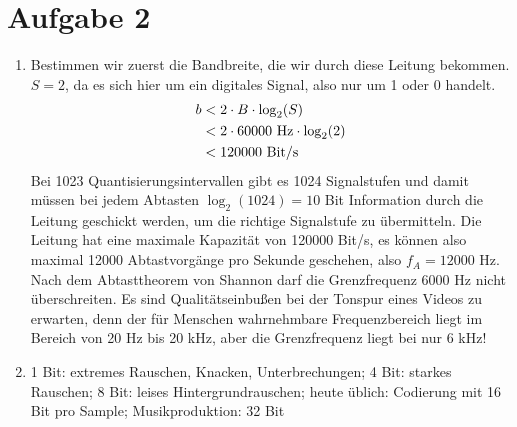 \documentclass{article}
\begin{document}
	\section*{Aufgabe 2}
	\begin{enumerate}[label=(\alph*)]
		\item Bestimmen wir zuerst die Bandbreite, die wir durch diese Leitung bekommen. $S=2$, da es sich hier um ein digitales Signal, also nur um 1 oder 0 handelt.
		\begin{align}
			b &< 2\cdot B\cdot \log_2(S) \notag \\
			&< 2\cdot 60000\text{ Hz}\cdot \log_2(2) \notag \\
			&< 120000 \text{ Bit/s} \notag
		\end{align}
		Bei 1023 Quantisierungsintervallen gibt es 1024 Signalstufen und damit müssen bei jedem Abtasten $\log_2(1024)=10$ Bit Information durch die Leitung geschickt werden, um die richtige Signalstufe zu übermitteln. Die Leitung hat eine maximale Kapazität von 120000 Bit/s, es können also maximal 12000 Abtastvorgänge pro Sekunde geschehen, also $f_A=12000$ Hz. Nach dem Abtasttheorem von Shannon darf die Grenzfrequenz 6000 Hz nicht überschreiten. Es sind Qualitätseinbußen bei der Tonspur eines Videos zu erwarten, denn der für Menschen wahrnehmbare Frequenzbereich liegt im Bereich von 20 Hz bis 20 kHz, aber die Grenzfrequenz liegt bei nur 6 kHz!
		\item 1 Bit: extremes Rauschen, Knacken, Unterbrechungen; 4 Bit: starkes Rauschen; 8 Bit: leises Hintergrundrauschen; heute üblich: Codierung mit 16 Bit pro Sample; Musikproduktion: 32 Bit
	\end{enumerate}
\end{document}
